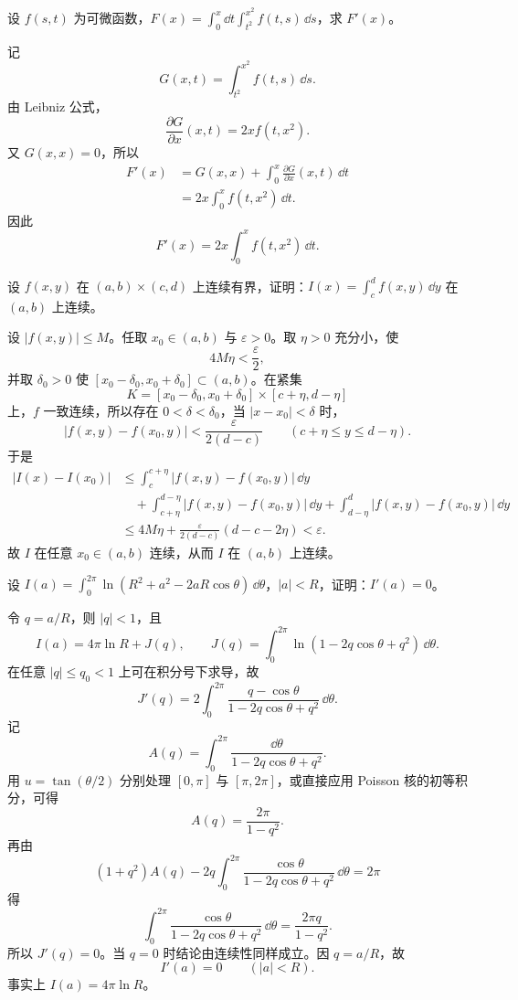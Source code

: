 \begin{xexercise}[2]
设 $f(s,t)$ 为可微函数，$F(x)=\displaystyle\int_0^x\dd t\int_{t^2}^{x^2}f(t,s)\,\dd s$，求 $F'(x)$。
\end{xexercise}
\begin{xsolution}
记
\[
G(x,t)=\int_{t^2}^{x^2}f(t,s)\,\dd s.
\]
由 Leibniz 公式，
\[
\frac{\partial G}{\partial x}(x,t)=2x f(t,x^2).
\]
又 $G(x,x)=0$，所以
\[
\begin{aligned}
F'(x)
&=G(x,x)+\int_0^x\frac{\partial G}{\partial x}(x,t)\,\dd t\\
&=2x\int_0^x f(t,x^2)\,\dd t.
\end{aligned}
\]
因此
\[
\boxed{F'(x)=2x\int_0^x f(t,x^2)\,\dd t}.
\]
\end{xsolution}


\begin{xexercise}[3]
设 $f(x,y)$ 在 $(a,b)\times(c,d)$ 上连续有界，证明：$I(x)=\displaystyle\int_c^d f(x,y)\,\dd y$ 在 $(a,b)$ 上连续。
\end{xexercise}
\begin{xsolution}
设 $|f(x,y)|\leqslant M$。任取 $x_0\in(a,b)$ 与 $\varepsilon>0$。取 $\eta>0$ 充分小，使
\[
4M\eta<\frac\varepsilon2,
\]
并取 $\delta_0>0$ 使 $[x_0-\delta_0,x_0+\delta_0]\subset(a,b)$。在紧集
\[
K=[x_0-\delta_0,x_0+\delta_0]\times[c+\eta,d-\eta]
\]
上，$f$ 一致连续，所以存在 $0<\delta<\delta_0$，当 $|x-x_0|<\delta$ 时，
\[
|f(x,y)-f(x_0,y)|<\frac{\varepsilon}{2(d-c)}
\qquad(c+\eta\leqslant y\leqslant d-\eta).
\]
于是
\[
\begin{aligned}
|I(x)-I(x_0)|
&\leqslant\int_c^{c+\eta}|f(x,y)-f(x_0,y)|\,\dd y\\
&\quad+\int_{c+\eta}^{d-\eta}|f(x,y)-f(x_0,y)|\,\dd y
+\int_{d-\eta}^{d}|f(x,y)-f(x_0,y)|\,\dd y\\
&\leqslant4M\eta+\frac{\varepsilon}{2(d-c)}(d-c-2\eta)<\varepsilon.
\end{aligned}
\]
故 $I$ 在任意 $x_0\in(a,b)$ 连续，从而 $I$ 在 $(a,b)$ 上连续。
\end{xsolution}


\begin{xexercise}[4]
设 $I(a)=\displaystyle\int_0^{2\pi}\ln(R^2+a^2-2aR\cos\theta)\,\dd\theta$，$|a|<R$，证明：$I'(a)=0$。
\end{xexercise}
\begin{xsolution}
令 $q=a/R$，则 $|q|<1$，且
\[
I(a)=4\pi\ln R+J(q),
\qquad
J(q)=\int_0^{2\pi}\ln(1-2q\cos\theta+q^2)\,\dd\theta.
\]
在任意 $|q|\leqslant q_0<1$ 上可在积分号下求导，故
\[
J'(q)=2\int_0^{2\pi}\frac{q-\cos\theta}{1-2q\cos\theta+q^2}\,\dd\theta.
\]
记
\[
A(q)=\int_0^{2\pi}\frac{\dd\theta}{1-2q\cos\theta+q^2}.
\]
用 $u=\tan(\theta/2)$ 分别处理 $[0,\pi]$ 与 $[\pi,2\pi]$，或直接应用 Poisson 核的初等积分，可得
\[
A(q)=\frac{2\pi}{1-q^2}.
\]
再由
\[
(1+q^2)A(q)-2q\int_0^{2\pi}
\frac{\cos\theta}{1-2q\cos\theta+q^2}\,\dd\theta=2\pi
\]
得
\[
\int_0^{2\pi}\frac{\cos\theta}{1-2q\cos\theta+q^2}\,\dd\theta
=\frac{2\pi q}{1-q^2}.
\]
所以 $J'(q)=0$。当 $q=0$ 时结论由连续性同样成立。因 $q=a/R$，故
\[
\boxed{I'(a)=0\qquad(|a|<R)}.
\]
事实上 $I(a)=4\pi\ln R$。
\end{xsolution}


